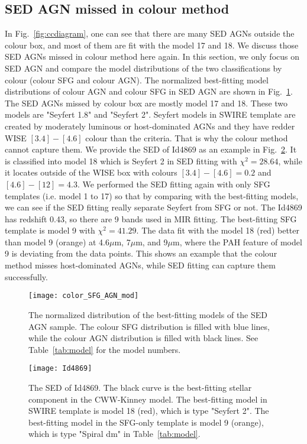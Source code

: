\documentclass[a4paper,fleqn,usenatbib]{mnras}
\begin{document}
\subsection{SED AGN missed in colour method}
In Fig.~\ref{fig:ccdiagram}, one can see that there are many SED AGNs outside the colour box, and most of them are fit with the model 17 and 18. We discuss those SED AGNs missed in colour method here again. In this section, we only focus on SED AGN and compare the model distributions of the two classifications by colour (colour SFG and colour AGN). The normalized best-fitting model distributions of colour AGN and colour SFG in SED AGN are shown in Fig.~\ref{fig:color_SFG_AGN_mod}. The SED AGNs missed by colour box are mostly model 17 and 18. These two models are "Seyfert 1.8" and "Seyfert 2". Seyfert models in SWIRE template are created by moderately luminous or host-dominated AGNs and they have redder WISE $[3.4]-[4.6]$ colour than the criteria. That is why the colour method cannot capture them. We provide the SED of Id4869 as an example in Fig.~\ref{fig:Id4869}. It is classified into model 18 which is Seyfert 2 in SED fitting with $\chi^{2}=28.64$, while it locates outside of the WISE box with colours $[3.4]-[4.6]=0.2$ and $[4.6]-[12]=4.3$. We performed the SED fitting again with only SFG templates (i.e. model 1 to 17) so that by comparing with the best-fitting models, we can see if the SED fitting really separate Seyfert from SFG or not. The Id4869 has redshift 0.43, so there are 9 bands used in MIR fitting. The best-fitting SFG template is model 9 with $\chi^{2}=41.29$. The data fit with the model 18 (red) better than model 9 (orange) at 4.6$\mu$m, 7$\mu$m, and 9$\mu$m, where the PAH feature of model 9 is deviating from the data points. This shows an example that the colour method misses host-dominated AGNs, while SED fitting can capture them successfully.      


\begin{figure}
	\texttt{[image: color\_SFG\_AGN\_mod]}
    \caption{The normalized distribution of the best-fitting models of the SED AGN sample. The colour SFG distribution is filled with blue lines, while the colour AGN distribution is filled with black lines. See Table~\ref{tab:model} for the model numbers.}
    \label{fig:color_SFG_AGN_mod}
\end{figure}

\begin{figure}
	\texttt{[image: Id4869]}
    \caption{The SED of Id4869. The black curve is the best-fitting stellar component in the CWW-Kinney model. The best-fitting model in SWIRE template is model 18 (red), which is type "Seyfert 2". The best-fitting model in the SFG-only template is model 9 (orange), which is type "Spiral dm" in Table~\ref{tab:model}.}
    \label{fig:Id4869}
\end{figure}
\end{document}

